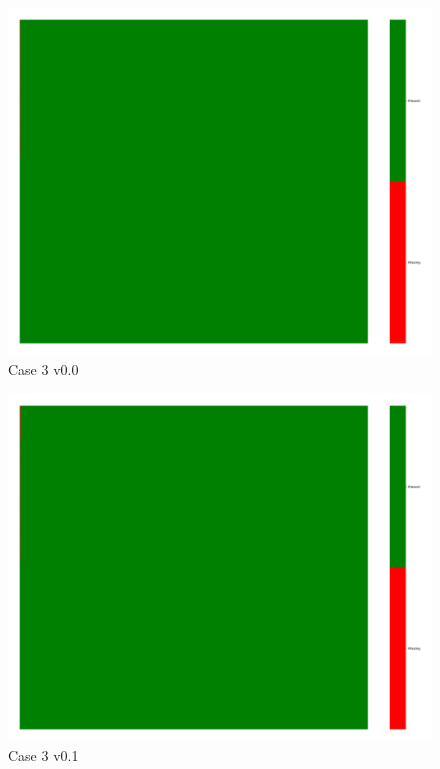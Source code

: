 \documentclass[a4paper,12pt]{article}
\begin{document}
\begin{figure}[H]
    \includegraphics[width=\linewidth]{case3_v0.0_heatmap_cleaned.png}
    \caption*{Case 3 v0.0}
\end{figure}

\begin{figure}[H]
    \includegraphics[width=\linewidth]{case3_v0.1_heatmap_cleaned.png}
    \caption*{Case 3 v0.1}
\end{figure}
\end{document}
